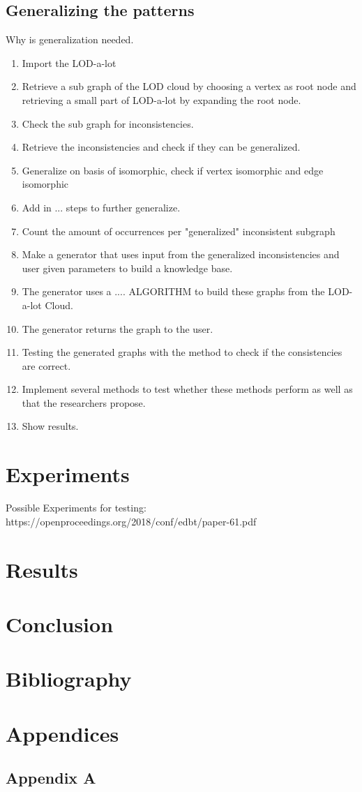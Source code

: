 \documentclass{article}
\begin{document}
\subsection{Generalizing the patterns}
Why is generalization needed.




\begin{enumerate}
	\item Import the LOD-a-lot
	\item Retrieve a sub graph of the LOD cloud by choosing a vertex as root node and retrieving a small part of LOD-a-lot by expanding the root node.
	\item Check the sub graph for inconsistencies. 
	\item Retrieve the inconsistencies and check if they can be generalized.
	\item Generalize on basis of isomorphic, check if vertex isomorphic and edge isomorphic
	\item Add in ... steps to further generalize.
	\item Count the amount of occurrences per "generalized" inconsistent subgraph
	\item Make a generator that uses input from the generalized inconsistencies and user given parameters to build a knowledge base.
	\item The generator uses a .... ALGORITHM to build these graphs from the LOD-a-lot Cloud.
	\item The generator returns the graph to the user.
	\item Testing the generated graphs with the method to check if the consistencies are correct. 
	\item Implement several methods to test whether these methods perform as well as that the researchers propose.
	\item Show results.
\end{enumerate}


\newpage
\section{Experiments}
Possible Experiments for testing:
https://openproceedings.org/2018/conf/edbt/paper-61.pdf

\newpage
\section{Results}


\newpage
\section{Conclusion}


\newpage
\section{Bibliography}


\newpage
\section{Appendices}
\subsection{Appendix A}
\end{document}

